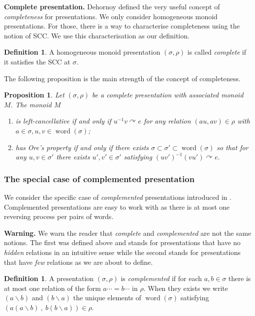 \documentclass[a4paper, 12pt]{amsart}
\numberwithin{equation}{section}
\newtheorem{proposition}[theorem]{Proposition}
\theoremstyle{definition}
\newtheorem{definition}[theorem]{Definition}
\newcommand{\act}{\curvearrowright}
\newcommand{\bs}{\backslash}
\DeclareMathOperator{\word}{word}
\begin{document}
{\bf Complete presentation.}
Dehornoy defined the very useful concept of \textit{completeness} for presentations. 
We only consider homogeneous monoid presentations. For those, there is a way to characterise completeness using the notion of SCC.
We use this characterisation as our definition.

\begin{definition}\cite[Proposition 4.4]{Dehornoy03}
A homogeneous monoid presentation $(\sigma,\rho)$ is called \textit{complete} if it satisfies the SCC at $\sigma$. 
\end{definition}

The following proposition is the main strength of the concept of completeness.

\begin{proposition}\label{prop:DehornoyRCF}\cite[Propositions 6.1 and 6.7]{Dehornoy03}
Let $(\sigma,\rho)$ be a complete presentation with associated monoid $M$.
The monoid $M$ 
\begin{enumerate}
\item is left-cancellative if and only if $u^{-1}v\act e$ for any relation $(au,av)\in \rho$ with $a\in \sigma, u,v\in \word(\sigma)$;
\item has Ore's property if and only if there exists $\sigma\subset \sigma'\subset \word(\sigma)$ so that for any $u,v\in \sigma'$ there exists $u',v'\in \sigma'$ satisfying $(uv')^{-1} (vu')\act e.$
\end{enumerate}
\end{proposition}

\subsubsection{The special case of complemented presentation}

We consider the specific case of {\it complemented} presentations introduced in \cite{Dehornoy97}.
Complemented presentations are easy to work with as there is at most one reversing process per pairs of words. 

{\bf Warning.} We warn the reader that {\it complete} and {\it complemented} are not the same notions. 
The first was defined above and stands for presentations that have no {\it hidden} relations in an intuitive sense while the second stands for presentations that have {\it few} relations as we are about to define.

\begin{definition}
A presentation $(\sigma,\rho)$ is {\it complemented} if for each $a,b\in \sigma$ there is at most one relation of the form $a\cdots=b\cdots$ in $\rho$.
When they exists we write $(a\bs b)$ and $(b\bs a)$ the unique elements of $\word(\sigma)$ satisfying $(a(a\bs b) \ , \ b(b\bs a))\in \rho.$ 
\end{definition}
\end{document}
